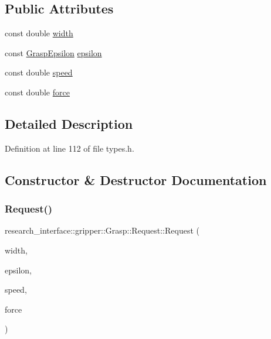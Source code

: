 \subsection*{Public Attributes}
\begin{DoxyCompactItemize}
\item 
const double \hyperlink{structresearch__interface_1_1gripper_1_1Grasp_1_1Request_adfb3ab33666b84558acf209f5c3ee5b5}{width}
\item 
const \hyperlink{structresearch__interface_1_1gripper_1_1Grasp_1_1GraspEpsilon}{Grasp\+Epsilon} \hyperlink{structresearch__interface_1_1gripper_1_1Grasp_1_1Request_a9a91583c7bc9901245b953351f5e7a82}{epsilon}
\item 
const double \hyperlink{structresearch__interface_1_1gripper_1_1Grasp_1_1Request_aa884e08fa60588e53d8d38e3c997e12c}{speed}
\item 
const double \hyperlink{structresearch__interface_1_1gripper_1_1Grasp_1_1Request_a84995a737e54752b029845255155eee1}{force}
\end{DoxyCompactItemize}


\subsection{Detailed Description}


Definition at line 112 of file types.\+h.



\subsection{Constructor \& Destructor Documentation}
\mbox{\label{structresearch__interface_1_1gripper_1_1Grasp_1_1Request_ad8d8a3ab0df9b6f2f915ad93994911f3}} 
\subsubsection{\texorpdfstring{Request()}{Request()}}
{\footnotesize\ttfamily research\+\_\+interface\+::gripper\+::\+Grasp\+::\+Request\+::\+Request (\begin{DoxyParamCaption}\item[{double}]{width,  }\item[{\hyperlink{structresearch__interface_1_1gripper_1_1Grasp_1_1GraspEpsilon}{Grasp\+Epsilon}}]{epsilon,  }\item[{double}]{speed,  }\item[{double}]{force }\end{DoxyParamCaption})\hspace{0.3cm}{\ttfamily [inline]}}



